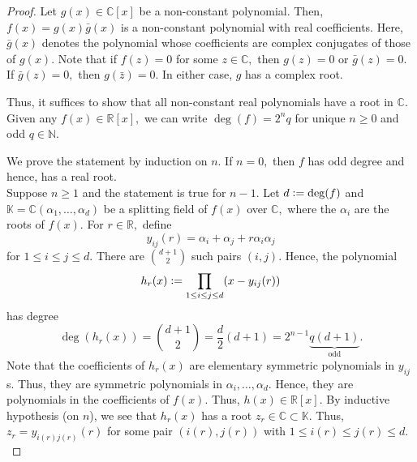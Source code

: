 \begin{proof}
    Let $g(x) \in \mathbb{C}[x]$ be a non-constant polynomial. Then, $f(x) = g(x)\bar{g}(x)$ is a non-constant polynomial with real coefficients. Here, $\bar{g}(x)$ denotes the polynomial whose coefficients are complex conjugates of those of $g(x).$ Note that if $f(z) = 0$ for some $z \in \mathbb{C},$ then $g(z) = 0$ or $\bar{g}(z) = 0.$ If $\bar{g}(z) = 0,$ then $g(\bar{z}) = 0.$ In either case, $g$ has a complex root.

    Thus, it suffices to show that all non-constant real polynomials have a root in $\mathbb{C}.$ Given any $f(x) \in \mathbb{R}[x],$ we can write $\deg(f) = 2^nq$ for unique $n \ge 0$ and odd $q \in \mathbb{N}.$

    We prove the statement by induction on $n.$ If $n = 0,$ then $f$ has odd degree and hence, has a real root. \\
    Suppose $n \ge 1$ and the statement is true for $n - 1.$ Let $d \vcentcolon= \deg(f)$ and $\mathbb{K} = \mathbb{C}(\alpha_1, \ldots, \alpha_d)$ be a splitting field of $f(x)$ over $\mathbb{C},$ where the $\alpha_i$ are the roots of $f(x).$ For $r \in \mathbb{R},$ define
    \begin{equation*} 
        y_{ij}(r) = \alpha_i + \alpha_j + r\alpha_i\alpha_j
    \end{equation*}
    for $1 \le i \le j \le d.$ There are $\binom{d + 1}{2}$ such pairs $(i, j).$ Hence, the polynomial
    \begin{equation*} 
        h_r(x) \vcentcolon= \prod_{1 \le i \le j \le d} (x - y_{ij}(r))
    \end{equation*}
    has degree
    \begin{equation*} 
        \deg(h_r(x)) = \binom{d + 1}{2} = \frac{d}{2}(d + 1) = 2^{n - 1}\underbrace{q(d + 1)}_{\text{odd}}.
    \end{equation*}
    Note that the coefficients of $h_r(x)$ are elementary symmetric polynomials in $y_{ij}$s. Thus, they are symmetric polynomials in $\alpha_i, \ldots, \alpha_d.$ Hence, they are polynomials in the coefficients of $f(x).$ Thus, $h(x) \in \mathbb{R}[x].$ By inductive hypothesis (on $n$), we see that $h_r(x)$ has a root $z_r \in \mathbb{C} \subset \mathbb{K}.$ Thus, $z_r = y_{i(r)j(r)}(r)$ for some pair $(i(r), j(r))$ with $1 \le i(r) \le j(r) \le d.$


\end{proof}
